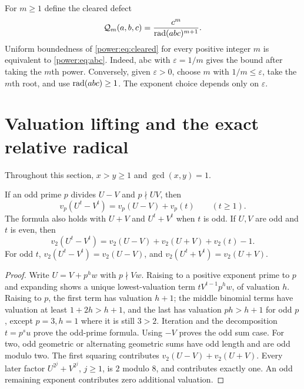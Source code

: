 For $m\ge1$ define the cleared defect
\begin{equation}\label{power:eq:cleared}
\mathcal Q_m(a,b,c)=\frac{c^m}{\operatorname{rad}(abc)^{m+1}}.
\end{equation}
Uniform boundedness of \eqref{power:eq:cleared} for every positive integer $m$ is
equivalent to \eqref{power:eq:abc}. Indeed, abc with $\varepsilon=1/m$ gives the
bound after taking the $m$th power. Conversely, given $\varepsilon>0$, choose
$m$ with $1/m\le\varepsilon$, take the $m$th root, and use
$\operatorname{rad}(abc)\ge1$. The exponent choice depends only on $\varepsilon$.

\section{Valuation lifting and the exact relative radical}
Throughout this section, $x>y\ge1$ and $\gcd(x,y)=1$.

\begin{lemma}\label{power:lem:lte}
If an odd prime $p$ divides $U-V$ and $p\nmid UV$, then
\[
v_p(U^t-V^t)=v_p(U-V)+v_p(t)\qquad(t\ge1).
\]
The formula also holds with $U+V$ and $U^t+V^t$ when $t$ is odd.
If $U,V$ are odd and $t$ is even, then
\[
v_2(U^t-V^t)=v_2(U-V)+v_2(U+V)+v_2(t)-1.
\]
For odd $t$, $v_2(U^t-V^t)=v_2(U-V)$, and
$v_2(U^t+V^t)=v_2(U+V)$.
\end{lemma}
\begin{proof}
Write $U=V+p^h w$ with $p\nmid Vw$. Raising to a positive exponent prime to
$p$ and expanding shows a unique lowest-valuation term $tV^{t-1}p^h w$,
of valuation $h$. Raising to $p$, the first term has valuation $h+1$;
the middle binomial terms have valuation at least $1+2h>h+1$, and the last
has valuation $ph>h+1$ for odd $p$, except $p=3,h=1$ where it is still
$3>2$. Iteration and the decomposition $t=p^s u$ prove the odd-prime formula.
Using $-V$ proves the odd sum case. For two, odd geometric or alternating
geometric sums have odd length and are odd modulo two. The first squaring
contributes $v_2(U-V)+v_2(U+V)$. Every later factor
$U^{2^j}+V^{2^j}$, $j\ge1$, is $2$ modulo $8$, and contributes exactly one.
An odd remaining exponent contributes zero additional valuation.
\end{proof}

